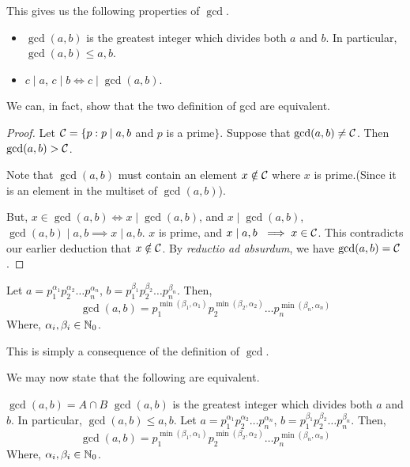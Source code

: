 This gives us the following properties of \(\gcd\).

\begin{proposition}
    \hfill
    \begin{itemize}
        \item \(\gcd(a,b)\) is the greatest integer which divides both \(a\) and \(b\). In particular, \(\gcd(a,b) \le a, b\).
        \item \(c \mid a\), \(c \mid b \iff c \mid \gcd(a,b)\).
    \end{itemize}
\end{proposition}

We can, in fact, show that the two definition of gcd are equivalent. 

\begin{proof}
    Let \( \mathcal C = \{p : p \mid a, b \) and \(p \) is a prime\( \} \). Suppose that \(\gcd(a,b) \ne \mathcal C \). Then \( \gcd(a,b) > \mathcal C \). 
    \\
    \par
    Note that \( \gcd(a,b)\) must contain an element \(x \notin \mathcal C \) where \(x\) is prime.(Since it is an element in the multiset of \(\gcd(a,b)\)). 
    \par
    But, \(x \in \gcd(a,b) \iff x \mid \gcd(a,b)\), and \(x \mid \gcd(a,b) \), \(\gcd(a,b) \mid a, b \implies x \mid a,b\). \(x\) is prime, and \(x \mid a,b\ \implies x \in \mathcal C\). This contradicts our earlier deduction that \(x \notin \mathcal C\). By \textit{reductio ad absurdum}, we have \(\gcd(a,b) = \mathcal C \).
\end{proof}

\begin{claim}
    
    Let \(a = p_{1} ^{\alpha_1} p_{2} ^{\alpha_2} \ldots p_{n}^{\alpha_n}\), \(b = p_{1} ^{\beta_1} p_{2} ^{\beta_2} \ldots p_{n}^{\beta_n}\). Then, \[\gcd(a,b)= p_{1} ^{\min(\beta_1, \alpha_1)} p_{2} ^{\min(\beta_2, \alpha_2)} \ldots p_{n}^{\min(\beta_n, \alpha_n)} \]
    Where, \(\alpha_i, \beta_i \in \mathbb N_0 \).
    
\end{claim}

This is simply a consequence of the definition of \(\gcd\).

\begin{definition}
    [GCD]
    We may now state that the following are equivalent.
    \begin{itemize}
        \ii \( \gcd(a,b) = A \cap B  \)     
        \ii \(\gcd(a,b)\) is the greatest integer which divides both \(a\) and \(b\). In particular, \(\gcd(a,b) \le a, b\).
        \ii Let \(a = p_{1} ^{\alpha_1} p_{2} ^{\alpha_2} \ldots p_{n}^{\alpha_n}\), \(b = p_{1} ^{\beta_1} p_{2} ^{\beta_2} \ldots p_{n}^{\beta_n}\). Then, \[\gcd(a,b)= p_{1} ^{\min(\beta_1, \alpha_1)} p_{2} ^{\min(\beta_2, \alpha_2)} \ldots p_{n}^{\min(\beta_n, \alpha_n)} \]
        Where, \(\alpha_i, \beta_i \in \mathbb N_0 \).
    \end{itemize}
    
\end{definition}

